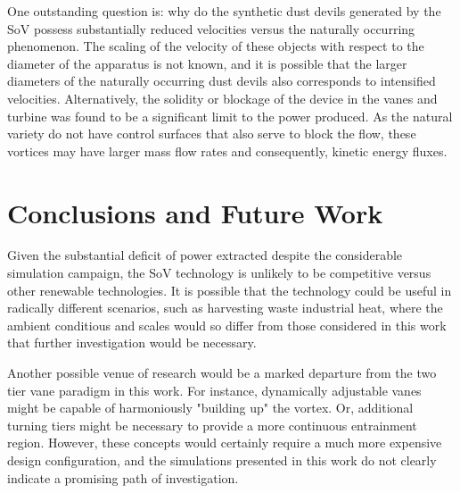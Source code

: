 



One outstanding question is: why do the synthetic dust devils generated by
the SoV possess substantially reduced velocities versus the naturally
occurring phenomenon. The scaling of the velocity of these objects with
respect to the diameter of the apparatus is not known, and it is
possible that the larger diameters of the naturally occurring dust
devils also corresponds to intensified velocities. Alternatively,
the solidity or blockage of the device in the vanes and turbine was
found to be a significant limit to the power produced. As the natural
variety do not have control surfaces that also serve to block the flow,
these vortices may have larger mass flow rates and consequently, 
kinetic energy fluxes.  
 
\section{Conclusions and Future Work}

Given the substantial deficit of power extracted despite the considerable
simulation campaign, the SoV technology is unlikely to be competitive 
versus other renewable technologies. 
It is possible that the technology could be useful in radically different scenarios, 
such as harvesting waste industrial heat, where the ambient conditious and scales 
would so differ from those considered in this work that further investigation 
would be necessary. 

Another possible venue of research would be a marked departure from the two tier 
vane paradigm in this work. For instance, dynamically adjustable vanes might be capable of 
harmoniously "building up" the vortex. Or, additional turning tiers might be necessary to 
provide a more continuous entrainment region. %
However, these concepts would certainly require a much more expensive design configuration, 
and the simulations presented in this work do not clearly indicate a promising 
path of investigation. 

